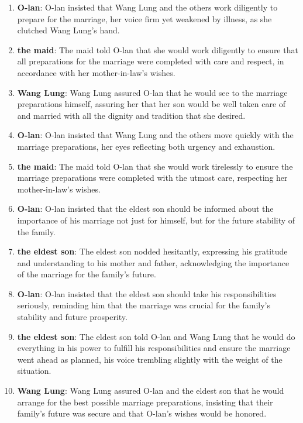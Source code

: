 \documentclass[10pt]{article}
\begin{document}
\begin{enumerate}
\item \textbf{O-lan}: O-lan insisted that Wang Lung and the others work diligently to prepare for the marriage, her voice firm yet weakened by illness, as she clutched Wang Lung's hand.

\item \textbf{the maid}: The maid told O-lan that she would work diligently to ensure that all preparations for the marriage were completed with care and respect, in accordance with her mother-in-law's wishes.

\item \textbf{Wang Lung}: Wang Lung assured O-lan that he would see to the marriage preparations himself, assuring her that her son would be well taken care of and married with all the dignity and tradition that she desired.

\item \textbf{O-lan}: O-lan insisted that Wang Lung and the others move quickly with the marriage preparations, her eyes reflecting both urgency and exhaustion.

\item \textbf{the maid}: The maid told O-lan that she would work tirelessly to ensure the marriage preparations were completed with the utmost care, respecting her mother-in-law's wishes.

\item \textbf{O-lan}: O-lan insisted that the eldest son should be informed about the importance of his marriage not just for himself, but for the future stability of the family.

\item \textbf{the eldest son}: The eldest son nodded hesitantly, expressing his gratitude and understanding to his mother and father, acknowledging the importance of the marriage for the family's future.

\item \textbf{O-lan}: O-lan insisted that the eldest son should take his responsibilities seriously, reminding him that the marriage was crucial for the family's stability and future prosperity.

\item \textbf{the eldest son}: The eldest son told O-lan and Wang Lung that he would do everything in his power to fulfill his responsibilities and ensure the marriage went ahead as planned, his voice trembling slightly with the weight of the situation.

\item \textbf{Wang Lung}: Wang Lung assured O-lan and the eldest son that he would arrange for the best possible marriage preparations, insisting that their family's future was secure and that O-lan's wishes would be honored.


\end{enumerate}
\end{document}
